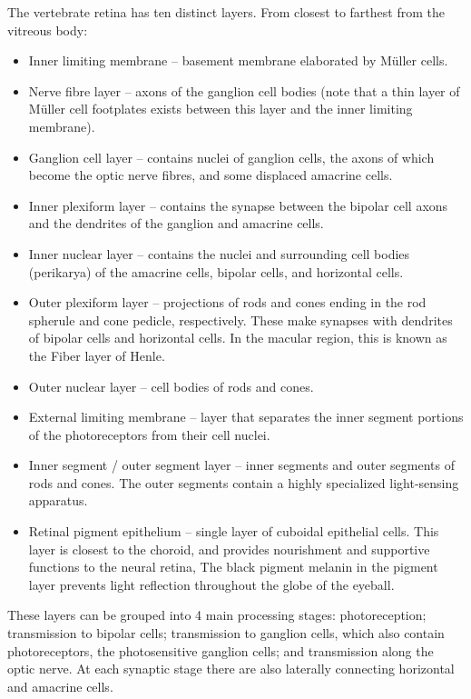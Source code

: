 The vertebrate retina has ten distinct layers. From closest to farthest from the vitreous body:

\begin{itemize}
\tightlist
\item
  Inner limiting membrane -- basement membrane elaborated by Müller cells.
\item
  Nerve fibre layer -- axons of the ganglion cell bodies (note that a thin layer of Müller cell footplates exists between this layer and the inner limiting membrane).
\item
  Ganglion cell layer -- contains nuclei of ganglion cells, the axons of which become the optic nerve fibres, and some displaced amacrine cells.
\item
  Inner plexiform layer -- contains the synapse between the bipolar cell axons and the dendrites of the ganglion and amacrine cells.
\item
  Inner nuclear layer -- contains the nuclei and surrounding cell bodies (perikarya) of the amacrine cells, bipolar cells, and horizontal cells.
\item
  Outer plexiform layer -- projections of rods and cones ending in the rod spherule and cone pedicle, respectively. These make synapses with dendrites of bipolar cells and horizontal cells. In the macular region, this is known as the Fiber layer of Henle.
\item
  Outer nuclear layer -- cell bodies of rods and cones.
\item
  External limiting membrane -- layer that separates the inner segment portions of the photoreceptors from their cell nuclei.
\item
  Inner segment / outer segment layer -- inner segments and outer segments of rods and cones. The outer segments contain a highly specialized light-sensing apparatus.
\item
  Retinal pigment epithelium -- single layer of cuboidal epithelial cells. This layer is closest to the choroid, and provides nourishment and supportive functions to the neural retina, The black pigment melanin in the pigment layer prevents light reflection throughout the globe of the eyeball.
\end{itemize}

These layers can be grouped into 4 main processing stages: photoreception; transmission to bipolar cells; transmission to ganglion cells, which also contain photoreceptors, the photosensitive ganglion cells; and transmission along the optic nerve. At each synaptic stage there are also laterally connecting horizontal and amacrine cells.



